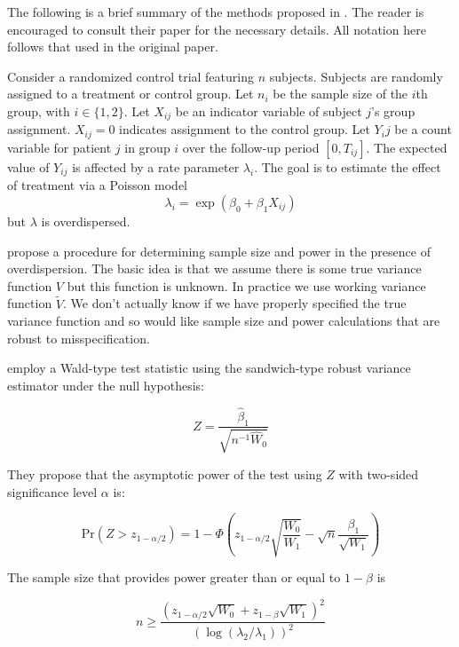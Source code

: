\documentclass{article}
\begin{document}
The following is a brief summary of the methods proposed in \cite{igeta2018}.
The reader is encouraged to consult their paper for the necessary details. All
notation here follows that used in the original paper.

Consider a randomized control trial featuring $n$ subjects. 
Subjects are randomly assigned to a treatment or control group.
Let $n_i$ be the sample size of the $i$th group, with $i \in \{1, 2\}$.
Let $X_{ij}$ be an indicator variable of subject $j$'s group assignment. 
$X_{ij}=0$ indicates assignment to the control group.
Let $Y_ij$ be a count variable for patient $j$ in group $i$ over the follow-up period $[0, T_{ij}]$.
The expected value of $Y_{ij}$ is affected by a rate parameter $\lambda_i$.
The goal is to estimate the effect of treatment via a Poisson model 
$$
\lambda_i 
= \exp{(\beta_0 + \beta_1 X_{ij})}
$$
but $\lambda$ is overdispersed. 

\cite{igeta2018} propose a procedure for determining sample size and power in
the presence of overdispersion. The basic idea is that we assume there is some 
true variance function $V$ but this function is unknown. In practice we use
working variance function $\tilde{V}$. We don't actually know if we have
properly specified the true variance function and so would like sample size and power
calculations that are robust to misspecification.

\cite{igeta2018} employ a Wald-type test statistic using the sandwich-type
robust variance estimator under the null hypothesis:

\begin{equation}
	Z = \frac{\hat{\beta}_1}{\sqrt{n^{-1} \hat{W}_0}}
\end{equation}

They propose that the asymptotic power of the test using $Z$ 
with two-sided significance level $\alpha$ is:

\begin{equation}
	\mathrm{Pr} \left( Z > z_{1 - \alpha/ 2} \right) 
	=
	1 - \Phi 
	\left(
	z_{1 - \alpha / 2}
	\sqrt{\frac{W_0}{W_1}}
	-
	\sqrt{n}
	\frac{\beta_1}{\sqrt{W_1}}
	\right)
\end{equation}

The sample size that provides power greater than or equal to $1 - \beta$ is

\begin{equation}
	n \geq \frac{(z_{1 - \alpha / 2} \sqrt{W_0} + z_{1 - \beta}
	\sqrt{W_1})^2}{\left( \log (\lambda_2 / \lambda_1 ) \right)^2}
\end{equation}
\end{document}
